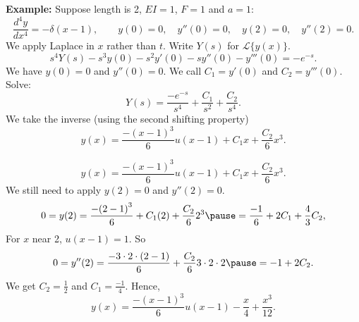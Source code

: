 \documentclass[10pt,aspectratio=169]{beamer}
\begin{document}
\begin{frame}

\textbf{Example:}
Suppose length is 2, $EI=1$, $F=1$ and $a=1$:
\[
\frac{d^4 y}{dx^4} = -\delta(x-1) ,
\qquad
y(0) = 0, \quad y''(0) = 0, \quad
y(2) = 0, \quad y''(2) = 0.
\]
\pause
We apply Laplace in $x$ rather than $t$.
Write $Y(s)$ for $\mathcal{L} \{ y(x) \}$.
\[
s^4Y(s)-s^3y(0)-s^2y'(0)-sy''(0)-y'''(0)
= -e^{-s}.
\]
\pause
We have $y(0) = 0$ and $y''(0) = 0$.  We call $C_1 = y'(0)$ and $C_2=y'''(0)$.
\pause
Solve:
\[
Y(s) = \frac{-e^{-s}}{s^4} + \frac{C_1}{s^2}+ \frac{C_2}{s^4} .
\]
\pause
We take the inverse (using the second shifting property)
\[
y(x) = \frac{-{(x-1)}^3}{6} u(x-1) + C_1 x + \frac{C_2}{6} x^3 .
\]
\end{frame}

\begin{frame}
\[
y(x) = \frac{-{(x-1)}^3}{6} u(x-1) + C_1 x + \frac{C_2}{6} x^3 .
\]
We still need to apply $y(2) = 0$ and $y''(2) = 0$.
\pause
\[
0 = y(2) = \frac{-{(2-1)}^3}{6} + C_1 (2) + \frac{C_2}{6} 2^3
\pause
=
\frac{-1}{6} + 2 C_1 + \frac{4}{3} C_2 ,
\]
\pause
For $x$ near 2, $u(x-1)=1$.  So
\[
0 = y''(2) = \frac{-3\cdot 2 \cdot (2-1)}{6} + \frac{C_2}{6} 3\cdot 2 \cdot 2
\pause
 = -1 + 2 C_2 .
\]
\pause
We get $C_2 = \frac{1}{2}$ and $C_1 = \frac{-1}{4}$.
\pause
Hence,
\[
y(x) = \frac{-{(x-1)}^3}{6} u(x-1) - \frac{x}{4} + \frac{x^3}{12} .
\]
\end{frame}
\end{document}
